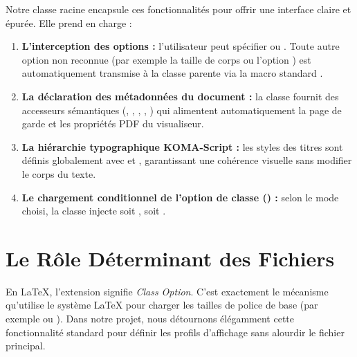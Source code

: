 Notre classe racine  encapsule ces fonctionnalités
pour offrir une interface claire et épurée.
Elle prend en charge :

\begin{enumerate}
  \item \textbf{L'interception des options :}
  l'utilisateur peut spécifier \code{[screen]} ou \code{[print]}.
  Toute autre option non reconnue (par exemple la taille de corps \code{12pt} ou l'option )
  est automatiquement transmise à la classe parente  via la macro standard .
  \item \textbf{La déclaration des métadonnées du document :}
  la classe fournit des accesseurs sémantiques (, , , , )
  qui alimentent automatiquement la page de garde et les propriétés PDF du visualiseur.
  \item \textbf{La hiérarchie typographique KOMA-Script :}
  les styles des titres sont définis globalement avec  et ,
  garantissant une cohérence visuelle sans modifier le corps du texte.
  \item \textbf{Le chargement conditionnel de l'option de classe () :}
  selon le mode choisi, la classe injecte soit , soit .
\end{enumerate}

\section{Le Rôle Déterminant des Fichiers }
\label{sec:mecanisme-clo}

En \LaTeX{}, l'extension  signifie \textit{Class Option}.
C'est exactement le mécanisme qu'utilise le système \LaTeX{} pour charger les tailles de police de base
(par exemple  ou ).
Dans notre projet, nous détournons élégamment cette fonctionnalité standard
pour définir les profils d'affichage sans alourdir le fichier principal.

